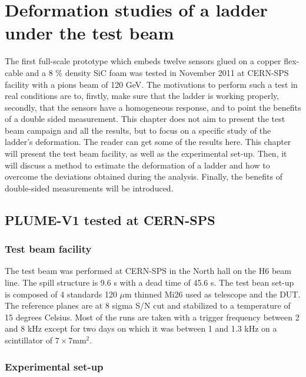 \chapter{Deformation studies of a ladder under the test beam}

  The first full-scale prototype which embeds twelve sensors glued on a copper flex-cable and a 8 \% density \gls{SiC} foam was tested in November 2011 at CERN-SPS facility with a pions beam of 120 GeV.
  The motivations to perform such a test in real conditions are to, firstly, make sure that the ladder is working properly, secondly, that the sensors have a homogeneous response, and to point the benefits of a double sided measurement.
  This chapter does not aim to present the test beam campaign and all the results, but to focus on a specific study of the ladder's deformation.
  The reader can get some of the results here.
  This chapter will present the test beam facility, as well as the experimental set-up.
  Then, it will discuss a method to estimate the deformation of a ladder and how to overcome the deviations obtained during the analysis. 
  Finally, the benefits of double-sided measurements will be introduced.
  
  \minitoc

  \section{PLUME-V1 tested at CERN-SPS}

    \subsection{Test beam facility}

    The test beam was performed at CERN-SPS in the North hall on the H6 beam line.
    The spill structure is 9.6 s with a dead time of 45.6 s. 
    The test bean set-up is composed of 4 standards 120 $\mu\text{m}$ thinned Mi26 used as telescope and the DUT. 
    The reference planes are at 8 sigma S/N cut and stabilized to a temperature of 15 degrees Celsius.
    Most of the runs are taken with a trigger frequency between 2 and 8 kHz except for two days on which it was between 1 and 1.3 kHz on a scintillator of $7 \times 7 \text{mm}^2$.
    
    \subsection{Experimental set-up}

